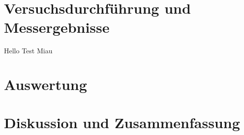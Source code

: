 \documentclass[11pt]{scrartcl}
\begin{document}
\section{Versuchsdurchführung und Messergebnisse}
\label{sec:versuchsdurchfuehrung-messergebnisse}

Hello Test Miau

\section{Auswertung}
\label{sec:auswertung}

\section{Diskussion und Zusammenfassung}
\label{sec:diskussion-zusammenfassung}

%
%
\listoffigures
\listoftables
\end{document}
